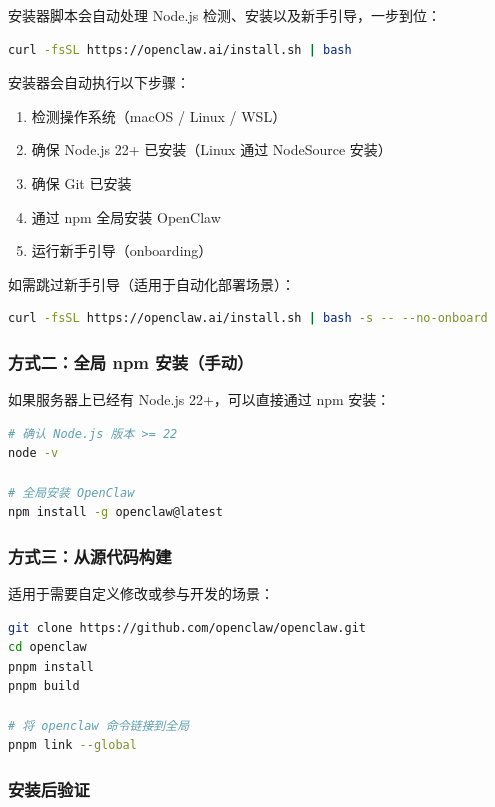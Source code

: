 安装器脚本会自动处理 Node.js 检测、安装以及新手引导，一步到位：

\begin{lstlisting}[language=bash]
curl -fsSL https://openclaw.ai/install.sh | bash
\end{lstlisting}

安装器会自动执行以下步骤：
\begin{enumerate}
  \item 检测操作系统（macOS / Linux / WSL）
  \item 确保 Node.js 22+ 已安装（Linux 通过 NodeSource 安装）
  \item 确保 Git 已安装
  \item 通过 npm 全局安装 OpenClaw
  \item 运行新手引导（onboarding）
\end{enumerate}

如需跳过新手引导（适用于自动化部署场景）：

\begin{lstlisting}[language=bash]
curl -fsSL https://openclaw.ai/install.sh | bash -s -- --no-onboard
\end{lstlisting}

\subsubsection{方式二：全局 npm 安装（手动）}

如果服务器上已经有 Node.js 22+，可以直接通过 npm 安装：

\begin{lstlisting}[language=bash]
# 确认 Node.js 版本 >= 22
node -v

# 全局安装 OpenClaw
npm install -g openclaw@latest
\end{lstlisting}

\subsubsection{方式三：从源代码构建}

适用于需要自定义修改或参与开发的场景：

\begin{lstlisting}[language=bash]
git clone https://github.com/openclaw/openclaw.git
cd openclaw
pnpm install
pnpm build

# 将 openclaw 命令链接到全局
pnpm link --global
\end{lstlisting}

\subsubsection{安装后验证}

